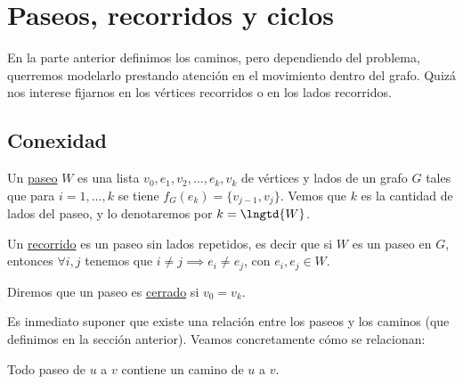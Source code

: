 \section{Paseos, recorridos y ciclos}

En la parte anterior definimos los caminos, pero dependiendo del problema, querremos modelarlo prestando atención en el movimiento dentro del grafo. Quizá nos interese fijarnos en los vértices recorridos o en los lados recorridos.

\subsection{Conexidad}

\begin{defn}
    Un \ul{paseo} $W$ es una lista $v_0, e_1, v_2, \dots, e_k, v_k$ de vértices y lados de un grafo $G$ tales que para $i = 1, \dots, k$ se tiene $f_G(e_k) = \{v_{j-1},v_j\}$. Vemos que $k$ es la cantidad de lados del paseo, y lo denotaremos por $k = \lngtd{W}$.
    
    Un \ul{recorrido} es un paseo sin lados repetidos, es decir que si $W$ es un paseo en $G$, entonces $\forall i,j$ tenemos que $i \neq j \implies e_i \neq e_j$, con $e_i, e_j \in W$.
    
    Diremos que un paseo es \ul{cerrado} si $v_0 = v_k$.
\end{defn}

Es inmediato suponer que existe una relación entre los paseos y los caminos (que definimos en la sección anterior). Veamos concretamente cómo se relacionan:

\begin{lem}
    Todo paseo de $u$ a $v$ contiene un camino de $u$ a $v$.
\end{lem}

